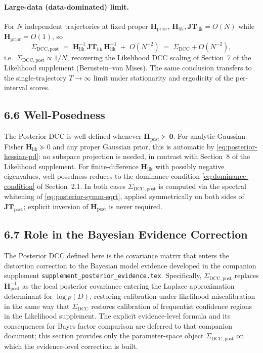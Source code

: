 \documentclass[11pt]{article}
\begin{document}
\paragraph{Large-data (data-dominated) limit.}
For $N$ independent trajectories at fixed proper $\mathbf H_{\mathrm{prior}}$, $\mathbf H_{\mathrm{lik}}, \mathbf{JT}_{\mathrm{lik}} = O(N)$ while $\mathbf H_{\mathrm{prior}} = O(1)$, so
\begin{equation}
\Sigma_{\mathrm{DCC},\mathrm{post}}
\;=\;
\mathbf H_{\mathrm{lik}}^{-1}\, \mathbf{JT}_{\mathrm{lik}}\, \mathbf H_{\mathrm{lik}}^{-1}
\;+\;
O(N^{-2})
\;=\;
\Sigma_{\mathrm{DCC}} + O(N^{-2}),
\label{eq:posterior-sigma-dcc-large-n}
\end{equation}
i.e.\ $\Sigma_{\mathrm{DCC},\mathrm{post}} \propto 1/N$, recovering the Likelihood DCC scaling of Section~7 of the Likelihood supplement (Bernstein--von Mises). The same conclusion transfers to the single-trajectory $T \to \infty$ limit under stationarity and ergodicity of the per-interval scores.

\subsection*{6.6 Well-Posedness}

The Posterior DCC is well-defined whenever $\mathbf H_{\mathrm{post}} \succ \mathbf 0$. For analytic Gaussian Fisher $\mathbf H_{\mathrm{lik}} \succeq 0$ and any proper Gaussian prior, this is automatic by \eqref{eq:posterior-hessian-pd}: no subspace projection is needed, in contrast with Section~8 of the Likelihood supplement. For finite-difference $\mathbf H_{\mathrm{lik}}$ with possibly negative eigenvalues, well-posedness reduces to the dominance condition \eqref{eq:dominance-condition} of Section~2.1. In both cases $\Sigma_{\mathrm{DCC},\mathrm{post}}$ is computed via the spectral whitening of \eqref{eq:posterior-symm-sqrt}, applied symmetrically on both sides of $\mathbf{JT}_{\mathrm{post}}$; explicit inversion of $\mathbf H_{\mathrm{post}}$ is never required.

\subsection*{6.7 Role in the Bayesian Evidence Correction}

The Posterior DCC defined here is the covariance matrix that enters the distortion correction to the Bayesian model evidence developed in the companion supplement \texttt{supplement\_posterior\_evidence.tex}. Specifically, $\Sigma_{\mathrm{DCC},\mathrm{post}}$ replaces $\mathbf H_{\mathrm{post}}^{-1}$ as the local posterior covariance entering the Laplace approximation determinant for $\log p(D)$, restoring calibration under likelihood miscalibration in the same way that $\Sigma_{\mathrm{DCC}}$ restores calibration of frequentist confidence regions in the Likelihood supplement. The explicit evidence-level formula and its consequences for Bayes factor comparison are deferred to that companion document; this section provides only the parameter-space object $\Sigma_{\mathrm{DCC},\mathrm{post}}$ on which the evidence-level correction is built.
\end{document}
